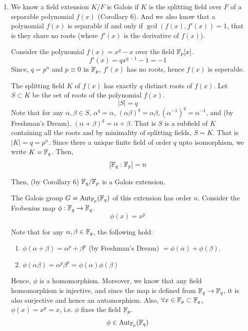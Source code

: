 \documentclass[12pt]{article}
\begin{document}
\begin{solution}
    \bbni
    \begin{enumerate}
        \item[(a)] We know a field extension $K/F$ is Galois if $K$ is the splitting field over $F$ of a separable polynomial $f(x)$ (Corollary 6). And we also know that a polynomial $f(x)$ is separable if and only if $\gcd(f(x), f'(x)) = 1$, that is they share no roots (where $f'(x)$ is the derivative of $f(x)$). 
        
        Consider the polynomial $f(x) = x^q - x$ over the field $\mathbb F_p[x]$. 
        \[f'(x) = qx^{q-1} - 1 = -1\]
        Since, $q = {p^n}$ and $p \equiv 0$ in $\mathbb F_p$, $f'(x)$ has no roots, hence $f(x)$ is seperable. 
        
        The splitting field $K$ of $f(x)$ has exactly $q$ distinct roots of $f(x)$. Let $S \subset K$ be the set of roots of the polynomial $f(x)$. 
        \[|S| = q\]
        Note that for any $\alpha, \beta \in S$, $\alpha^q = \alpha$, $(\alpha\beta)^q = \alpha\beta, (\alpha^{-1})^q = \alpha^{-1}$, and (by Freshman's Dream), $(\alpha+\beta)^q = \alpha + \beta$. That is $S$ is a subfield of $K$ containing all the roots and by minimality of splitting fields, $S = K$. That is $|K| = q = p^n$. Since there a unique finite field of order $q$ upto isomorphism, we write $K = \mathbb F_q$. Then, 
        \[[\mathbb F_q: \mathbb F_p] =  n \]

        Then, (by Corollary 6) $\mathbb F_q/\mathbb F_p$ is a Galois extension. 

        The Galois group $G = \operatorname{Aut}_{\mathbb F_p}(\mathbb F_q)$ of this extension has order $n$. Consider the Frobenius map $\phi : \mathbb F_q \to \mathbb F_q$.
        \[\phi(x) = x^p\]

        Note that for any $\alpha, \beta \in \mathbb F_q$, the following hold: 
        \begin{enumerate}
            \item $\phi(\alpha + \beta) = \alpha^p + \beta^p$ (by Freshman's Dream) $ = \phi(\alpha) + \phi(\beta)$. 
            \item $\phi(\alpha \beta) = \alpha^p \beta^p = \phi(\alpha) \phi(\beta)$ 
        \end{enumerate} 
        Hence, $\phi$ is a homomorphism. Moreover, we know that any field homomorphism is injective, and since the map is defined from $\mathbb F_q \to \mathbb F_q$, it is also surjective and hence an automorphism. Also, $\forall x \in \mathbb F_p \subset \mathbb F_q$, $\phi(x) = x^p = x$, i.e. $\phi$ fixes the field $\mathbb F_p$. 
        \[\phi \in \operatorname{Aut}_{\mathbb F_p}(\mathbb F_q)\] 


\end{enumerate}
\end{solution}
\end{document}
